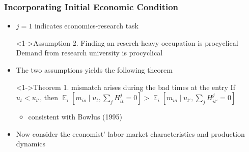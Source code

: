 \documentclass[11pt]{beamer}
\begin{document}
\begin{frame}
	\frametitle{Incorporating Initial Economic Condition}
	\begin{itemize}
		\begin{block}<1->{Assumption 1. most workers are research-oriented}
			$\alpha_{i}=\left( \alpha_{i}^1,...,\alpha_{i}^J\right) \equiv m(X_i)+e_{it}$, where $\max \alpha_{i}^1 > \max \alpha_{i}^j$ for all $j\neq 1$  
		\end{block}
		\item $j=1$ indicates economics-research task 
		\begin{block}<1->{Assumption 2. Finding an reserch-heavy occupation is procyclical}
			Demand from research university is procyclical
		\end{block}	
		\item The two assumptions yields the following theorem
		\begin{block}<1->{Theorem 1. mismatch arises during the bad times at the entry}
			If $u_t < u_{t'}$, then $\mathop{{}\mathbb{E}}_{i}\left[ m_{io} \mid u_t, \sum_{j} H_{it}^{j} = 0 \right] > \mathop{{}\mathbb{E}}_{i}\left[ m_{io} \mid u_{t'}, \sum_{j} H_{it'}^{j} = 0 \right] $	
		\end{block}
		\begin{itemize}
			\item consistent with Bowlus (1995)
		\end{itemize}
		\item Now consider the economist' labor market characteristics and production dynamics
	\end{itemize}
\end{frame}
\end{document}
